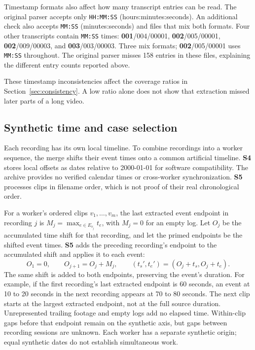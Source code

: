 Timestamp formats also affect how many transcript entries can be read. The original parser accepts only \texttt{HH:MM:SS} (hours:minutes:seconds). An additional check also accepts \texttt{MM:SS} (minutes:seconds) and files that mix both formats. Four other transcripts contain \texttt{MM:SS} times: \textbf{001}/004/00001, \textbf{002}/005/00001, \textbf{002}/009/00003, and \textbf{003}/003/00003. Three mix formats; \textbf{002}/005/00001 uses \texttt{MM:SS} throughout. The original parser misses 158 entries in these files, explaining the different entry counts reported above.

These timestamp inconsistencies affect the coverage ratios in Section~\ref{sec:consistency}. A low ratio alone does not show that extraction missed later parts of a long video.

\subsection{Synthetic time and case selection}
\label{sec:cases}
Each recording has its own local timeline. To combine recordings into a worker sequence, the merge shifts their event times onto a common artificial timeline. \textbf{S4} stores local offsets as dates relative to 2000-01-01 for software compatibility. The archive provides no verified calendar times or cross-worker synchronization. \textbf{S5} processes clips in filename order, which is not proof of their real chronological order.

For a worker's ordered clips $v_1,\ldots,v_m$, the last extracted event endpoint in recording $j$ is $M_j=\max_{e\in E_{v_j}}t_e$, with $M_j=0$ for an empty log. Let $O_j$ be the accumulated time shift for that recording, and let the primed endpoints be the shifted event times. \textbf{S5} adds the preceding recording's endpoint to the accumulated shift and applies it to each event:
\begin{equation}
 O_1=0,\qquad O_{j+1}=O_j+M_j,\qquad
 (t_s',t_e')=(O_j+t_s,O_j+t_e).
\end{equation}
The same shift is added to both endpoints, preserving the event's duration. For example, if the first recording's last extracted endpoint is 60 seconds, an event at 10 to 20 seconds in the next recording appears at 70 to 80 seconds. The next clip starts at the largest extracted endpoint, not at the full source duration. Unrepresented trailing footage and empty logs add no elapsed time. Within-clip gaps before that endpoint remain on the synthetic axis, but gaps between recording sessions are unknown. Each worker has a separate synthetic origin; equal synthetic dates do not establish simultaneous work.

